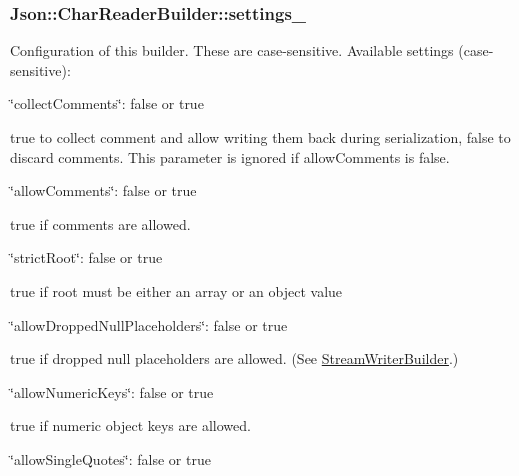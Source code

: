 \subsubsection[{\texorpdfstring{settings\+\_\+}{settings_}}]{ Json\+::\+Char\+Reader\+Builder\+::settings\+\_\+}\hypertarget{class_json_1_1_char_reader_builder_ac69b7911ad64c171c51ebaf2ea26d958}{}\label{class_json_1_1_char_reader_builder_ac69b7911ad64c171c51ebaf2ea26d958}
Configuration of this builder. These are case-\/sensitive. Available settings (case-\/sensitive)\+:
\begin{DoxyItemize}
\item {\ttfamily \char`\"{}collect\+Comments\char`\"{}\+: false or true}
\begin{DoxyItemize}
\item true to collect comment and allow writing them back during serialization, false to discard comments. This parameter is ignored if allow\+Comments is false.
\end{DoxyItemize}
\item {\ttfamily \char`\"{}allow\+Comments\char`\"{}\+: false or true}
\begin{DoxyItemize}
\item true if comments are allowed.
\end{DoxyItemize}
\item {\ttfamily \char`\"{}strict\+Root\char`\"{}\+: false or true}
\begin{DoxyItemize}
\item true if root must be either an array or an object value
\end{DoxyItemize}
\item {\ttfamily \char`\"{}allow\+Dropped\+Null\+Placeholders\char`\"{}\+: false or true}
\begin{DoxyItemize}
\item true if dropped null placeholders are allowed. (See \hyperlink{class_json_1_1_stream_writer_builder}{Stream\+Writer\+Builder}.)
\end{DoxyItemize}
\item {\ttfamily \char`\"{}allow\+Numeric\+Keys\char`\"{}\+: false or true}
\begin{DoxyItemize}
\item true if numeric object keys are allowed.
\end{DoxyItemize}
\item {\ttfamily \char`\"{}allow\+Single\+Quotes\char`\"{}\+: false or true}
\begin{DoxyItemize}

\end{DoxyItemize}
\end{DoxyItemize}
